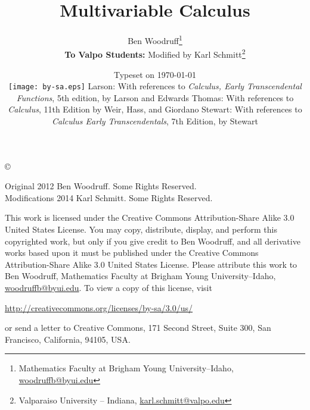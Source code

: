 \documentclass[letterpaper,oneside]{book}%
\newcommand{\valpo}[1]{\textbf{To Valpo Students:} #1}
\newcommand{\valpo}[1]{}
\newcommand{\thomasee}[1]{Thomas: #1}
\newcommand{\thomasee}[1]{}
\newcommand{\larsonfive}[1]{Larson: #1}
\newcommand{\larsonfive}[1]{}
\newcommand{\stewarts}[1]{Stewart: #1}
\newcommand{\stewarts}[1]{}
\theoremstyle{plain}
\theoremstyle{box}
\theoremstyle{problem}
\begin{document}
\frontmatter
\title{Multivariable Calculus}
\author{Ben Woodruff\thanks{Mathematics Faculty at Brigham Young
    University--Idaho, \url{woodruffb@byui.edu}}\\
		\valpo{Modified by Karl Schmitt\thanks{Valparaiso University -- Indiana, \url{karl.schmitt@valpo.edu}}}}
\date{Typeset on \today\\
\vfill
\texttt{[image: by-sa.eps]}
\vfill
\larsonfive{With references to \emph{Calculus, Early Transcendental
    Functions}, 5th edition, by Larson and Edwards}
\thomasee{With references to \emph{Calculus}, 11th Edition by Weir, Hass, and Giordano}
\stewarts{With references to \emph{Calculus Early Transcendentals}, 7th Edition, by Stewart}}
\maketitle
\thispagestyle{empty}
\noindent\copyright{ Original 2012 Ben Woodruff.  Some Rights Reserved.\\
Modifications 2014 Karl Schmitt. Some Rights Reserved.

\bigskip

\noindent This work is licensed under the Creative Commons Attribution-Share Alike 3.0 United States License.  You may copy, distribute, display, and perform this copyrighted work, but only if you give credit to Ben Woodruff, and all derivative works based upon it must be published under the Creative Commons Attribution-Share Alike 3.0 United States License. Please attribute this work to Ben Woodruff, Mathematics Faculty at Brigham Young University--Idaho, \url{woodruffb@byui.edu}. To view a copy of this license, visit
\begin{center}
  \url{http://creativecommons.org/licenses/by-sa/3.0/us/}
\end{center}
or send a letter to Creative Commons, 171 Second Street, Suite 300, San Francisco, California, 94105, USA.}
\end{document}
